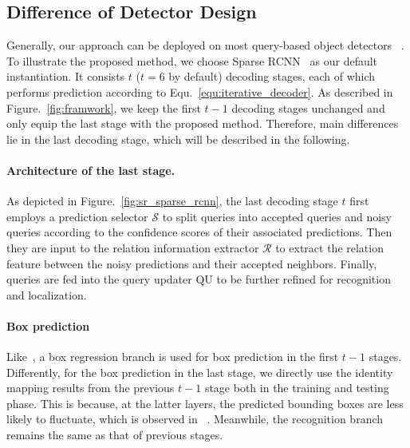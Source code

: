 \documentclass[final]{cvpr}
\begin{document}
\vspace{-1pt}
\subsection{Difference of Detector Design}

Generally, our approach can be deployed on most query-based object detectors ~\cite{carion2020end, sun2020sparse, zhu2021deformable}. To illustrate the proposed method, we choose Sparse RCNN~\cite{sun2020sparse} as our default instantiation. It consists $t$ ($t=6$ by default) decoding stages, each of which performs prediction according to Equ.~\eqref{equ:iterative_decoder}. As described in Figure.~\ref{fig:framwork}, we keep the first $t-1$ decoding stages unchanged and only equip the last stage with the proposed method. Therefore, main differences lie in the last decoding stage, which will be described in the following.

\vspace{-0.6cm}
\paragraph{Architecture of the last stage.} 

As depicted in Figure.~\ref{fig:sr_sparse_rcnn}, the last decoding stage $t$ first employs a prediction selector $\mathcal{S}$ to split queries into accepted queries and noisy queries according to the confidence scores of their associated predictions. Then they are input to the relation information extractor $\mathcal{R}$ to extract the relation feature between the noisy predictions and their accepted neighbors. Finally, queries are fed into the query updater $\text{QU}$ to be further refined for recognition and localization.













\vspace{-0.6cm}
\paragraph{Box prediction}
Like~\cite{sun2020sparse}, a box regression branch is used for box prediction in the first $t-1$ stages. Differently, for the box prediction in the last stage, we directly use the identity mapping results from the previous $t-1$ stage both in the training and testing phase. This is because, at the latter layers, the predicted bounding boxes are less likely to fluctuate, which is observed in ~\cite{lin2020detr}. Meanwhile, the recognition branch remains the same as that of previous stages. 
\end{document}
